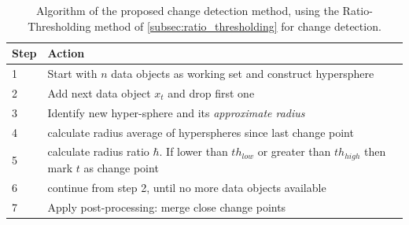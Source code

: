 \begin{center}\begin{table}
\begin{tabular}{ l p{12cm} }
  \hline
  Step & Action \\
  \hline
  1 & Start with $n$ data objects as working set and construct hypersphere \\
  2 & Add next data object $x_t$ and drop first one \\
  3 & Identify new hyper-sphere and its \emph{approximate radius} \\
  4 & calculate radius average of hyperspheres since last change point \\
  5 & calculate radius ratio $\hbar$. If lower than ${th}_{low}$ or greater than ${th}_{high}$ then mark $t$ as change point \\
  6 & continue from step 2, until no more data objects available \\
  7 & Apply post-processing: merge close change points \\
  \hline
\end{tabular}
\caption[Proposed algorithm]{Algorithm of the proposed change detection method, using the Ratio-Thresholding method of \ref{subsec:ratio_thresholding} for change detection.}
\label{tab:algorithm_proposed_method}
\end{table}\end{center}

